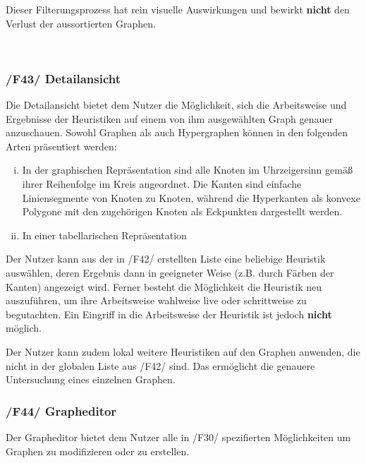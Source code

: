 \documentclass{article}
\begin{document}
	Dieser Filterungsprozess hat rein visuelle Auswirkungen und bewirkt \textbf{nicht} den Verlust der aussortierten Graphen.
	
	~\newpage
	\subsubsection*{/F43/ Detailansicht} \label{f43} 
	
	Die Detailansicht bietet dem Nutzer die Möglichkeit, sich die Arbeitsweise und Ergebnisse der Heuristiken auf einem von ihm ausgewählten Graph genauer anzuschauen. Sowohl Graphen als auch Hypergraphen können in den folgenden Arten präsentiert werden:
	\begin{enumerate}[i)]
		\item{In der graphischen Repräsentation sind alle Knoten im Uhrzeigersinn gemäß ihrer Reihenfolge im Kreis angeordnet. Die Kanten sind einfache Liniensegmente von Knoten zu Knoten, während die Hyperkanten als konvexe Polygone mit den zugehörigen Knoten als Eckpunkten dargestellt werden.}
		\item{In einer tabellarischen Repräsentation}
	\end{enumerate}
	
	Der Nutzer kann aus der in /F42/ erstellten Liste eine beliebige Heuristik auswählen, deren Ergebnis dann in geeigneter Weise (z.B. durch Färben der Kanten) angezeigt wird. Ferner besteht die Möglichkeit die Heuristik neu auszuführen, um ihre Arbeitsweise wahlweise live oder schrittweise zu begutachten. Ein Eingriff in die Arbeitsweise der Heuristik ist jedoch \textbf{nicht} möglich.
	
	Der Nutzer kann zudem lokal weitere Heuristiken auf den Graphen anwenden, die nicht in der globalen Liste aus /F42/ sind. Das ermöglicht die genauere Untersuchung eines einzelnen Graphen.
	
	\subsubsection*{/F44/ Grapheditor} \label{f44} 
	Der Grapheditor bietet dem Nutzer alle in /F30/ spezifierten Möglichkeiten um Graphen zu modifizieren oder zu erstellen.
	
	
	~\newpage
\end{document}

